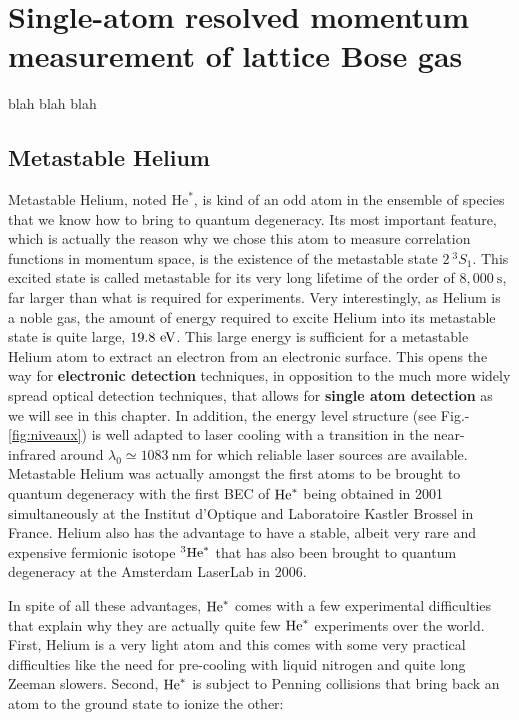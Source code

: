 \chapter{Single-atom resolved momentum measurement of lattice Bose gas}

blah blah blah

\section{Metastable Helium}

Metastable Helium, noted $\mathrm{He}^*$, is kind of an odd atom in the ensemble of species that we know how to bring to quantum degeneracy. Its most important feature, which is actually the reason why we chose this atom to measure correlation functions in momentum space, is the existence of the metastable state $2 \ ^3 S_1$. This excited state is called metastable for its very long lifetime of the order of $8,000 \ \mathrm{s}$, far larger than what is required for experiments. Very interestingly, as Helium is a noble gas, the amount of energy required to excite Helium into its metastable state is quite large, $19.8 \ \rm{eV}$. This large energy is sufficient for a metastable Helium atom to extract an electron from an electronic surface. This opens the way for \textbf{electronic detection} techniques, in opposition to the much more widely spread optical detection techniques, that allows for \textbf{single atom detection} as we will see in this chapter. In addition, the energy level structure (see Fig.-\ref{fig:niveaux}) is well adapted to laser cooling with a transition in the near-infrared around $\lambda_0 \simeq 1083 \ \mathrm{nm}$ for which reliable laser sources are available. Metastable Helium was actually amongst the first atoms to be brought to quantum degeneracy with the first BEC of $\mathrm{He}^*$ being obtained in 2001 simultaneously at the Institut d'Optique and Laboratoire Kastler Brossel in France. Helium also has the advantage to have a stable, albeit very rare and expensive fermionic isotope $^3 \mathrm{He}^*$ that has also been brought to quantum degeneracy at the Amsterdam LaserLab in 2006.

In spite of all these advantages, $\mathrm{He}^*$ comes with a few experimental difficulties that explain why they are actually quite few $\mathrm{He}^*$ experiments over the world. First, Helium is a very light atom and this comes with some very practical difficulties like the need for pre-cooling with liquid nitrogen and quite long Zeeman slowers. Second, $\mathrm{He}^*$ is subject to Penning collisions that bring back an atom to the ground state to ionize the other:

